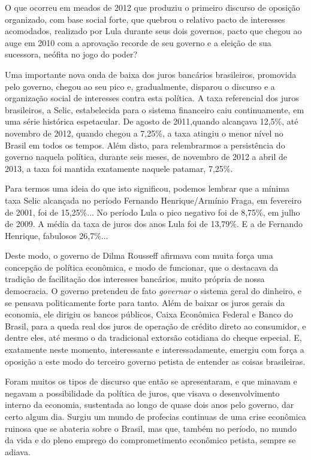 O que ocorreu em meados de 2012 que produziu o primeiro discurso de
oposição organizado, com base social forte, que quebrou o relativo pacto
de interesses acomodados, realizado por Lula durante seus dois governos,
pacto que chegou ao auge em 2010 com a aprovação recorde de seu governo
e a eleição de sua sucessora, neófita no jogo do poder?

Uma importante nova onda de baixa dos juros bancários brasileiros,
promovida pelo governo, chegou ao seu pico e, gradualmente, disparou o
discurso e a organização social de interesses contra esta política. A
taxa referencial dos juros brasileiros, a Selic, estabelecida para o
sistema financeiro caiu continuamente, em uma série histórica
espetacular. De agosto de 2011,quando alcançava 12,5\%, até novembro de
2012, quando chegou a 7,25\%, a taxa atingiu o menor nível no Brasil em
todos os tempos. Além disto, para relembrarmos a persistência do governo
naquela política, durante seis meses, de novembro de 2012 a abril de
2013, a taxa foi mantida exatamente naquele patamar, 7,25\%.

Para termos uma ideia do que isto significou, podemos lembrar que a
mínima taxa Selic alcançada no período Fernando Henrique/Armínio Fraga,
em fevereiro de 2001, foi de 15,25\%... No período Lula o pico negativo
foi de 8,75\%, em julho de 2009. A média da taxa de juros dos anos Lula
foi de 13,79\%. E a de Fernando Henrique, fabulosos 26,7\%...

Deste modo, o governo de Dilma Rousseff afirmava com muita força uma
concepção de política econômica, e modo de funcionar, que o destacava da
tradição de facilitação dos interesses bancários, muito própria de nossa
democracia. O governo pretendeu de fato \emph{governar} o sistema geral
do dinheiro, e se pensava politicamente forte para tanto. Além de baixar
os juros gerais da economia, ele dirigiu os bancos públicos, Caixa
Econômica Federal e Banco do Brasil, para a queda real dos juros de
operação de crédito direto ao consumidor, e dentre eles, até mesmo o da
tradicional extorsão cotidiana do cheque especial. E, exatamente neste
momento, interessante e interessadamente, emergiu com força a oposição a
este modo do terceiro governo petista de entender as coisas brasileiras.

Foram muitos os tipos de discurso que então se apresentaram, e que
minavam e negavam a possibilidade da política de juros, que visava o
desenvolvimento interno da economia, sustentada ao longo de quase dois
anos pelo governo, dar certo algum dia. Surgiu um mundo de profecias
continuas de uma crise econômica ruinosa que se abateria sobre o Brasil,
mas que, também no período, no mundo da vida e do pleno emprego do
comprometimento econômico petista, sempre se adiava.

